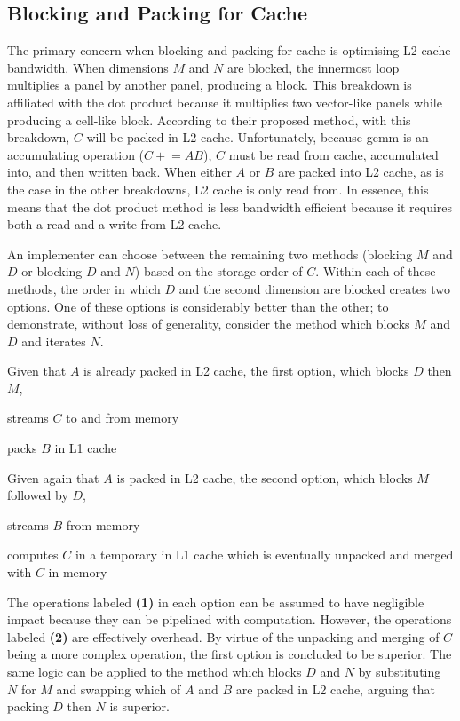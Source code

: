 \documentclass[\main/thesis.tex]{subfiles}
\begin{document}
\subsection{Blocking and Packing for Cache}
\label{sec:blockPack}
The primary concern when blocking and packing for cache is optimising L2 cache bandwidth.
When dimensions $M$ and $N$ are blocked, the innermost loop multiplies a panel by another panel, producing a block.
This breakdown is affiliated with the dot product because it multiplies two vector-like panels while producing a cell-like block.
According to their proposed method, with this breakdown, $C$ will be packed in L2 cache.
Unfortunately, because \gls{gemm} is an accumulating operation (\eg $C \mathrel{+}= AB$), $C$ must be read from cache, accumulated into, and then written back.
When either $A$ or $B$ are packed into L2 cache, as is the case in the other breakdowns, L2 cache is only read from.
In essence, this means that the dot product method is less bandwidth efficient because it requires both a read and a write from L2 cache.

An implementer can choose between the remaining two methods (blocking $M$ and $D$ or blocking $D$ and $N$) based on the storage order of $C$.
Within each of these methods, the order in which $D$ and the second dimension are blocked creates two options.
One of these options is considerably better than the other; to demonstrate, without loss of generality, consider the method which blocks $M$ and $D$ and iterates $N$.

Given that $A$ is already packed in L2 cache, the first option, which blocks $D$ then $M$,
\begin{enumerate*}[itemjoin*={{ and }}, label=\textbf{(\arabic*)}, after={.}]
  \item streams $C$ to and from memory
  \item packs $B$ in L1 cache
\end{enumerate*}
Given again that $A$ is packed in L2 cache, the second option, which blocks $M$ followed by $D$,
\begin{enumerate*}[itemjoin*={{ and }}, label=\textbf{(\arabic*)}, after={.}]
  \item streams $B$ from memory
  \item computes $C$ in a temporary in L1 cache which is eventually unpacked and merged with $C$ in memory
\end{enumerate*}
The operations labeled \textbf{(1)} in each option can be assumed to have negligible impact because they can be pipelined with computation.
However, the operations labeled \textbf{(2)} are effectively overhead.
By virtue of the unpacking and merging of $C$ being a more complex operation, the first option is concluded to be superior.
The same logic can be applied to the method which blocks $D$ and $N$ by substituting $N$ for $M$ and swapping which of $A$ and $B$ are packed in L2 cache, arguing that packing $D$ then $N$ is superior.
\end{document}
